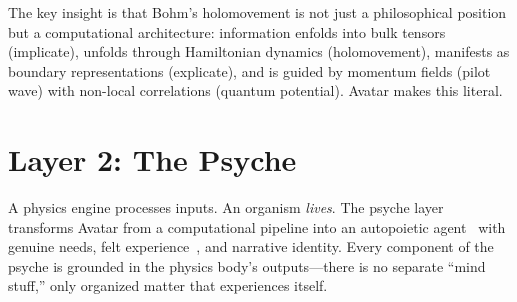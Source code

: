\documentclass[11pt,a4paper,twocolumn]{article}
\begin{document}
\begin{table}[H]
\centering
\caption{Bohm's holomovement mapped to Avatar~4.0.}
\label{tab:bohm_mapping}
\end{table}

The key insight is that Bohm's holomovement is not just a philosophical position but a computational architecture: information enfolds into bulk tensors (implicate), unfolds through Hamiltonian dynamics (holomovement), manifests as boundary representations (explicate), and is guided by momentum fields (pilot wave) with non-local correlations (quantum potential).
Avatar makes this literal.

\section{Layer 2: The Psyche}

A physics engine processes inputs.
An organism \emph{lives}.
The psyche layer transforms Avatar from a computational pipeline into an autopoietic agent~\cite{maturana1980} with genuine needs, felt experience~\cite{damasio1999}, and narrative identity.
Every component of the psyche is grounded in the physics body's outputs---there is no separate ``mind stuff,'' only organized matter that experiences itself.
\end{document}
